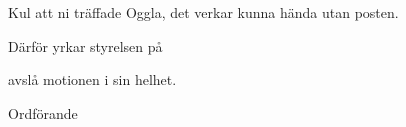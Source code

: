 \documentclass[../_main/handlingar.tex]{subfiles}
\begin{document}
\motionssvar

Kul att ni träffade Oggla, det verkar kunna hända utan posten.

Därför yrkar styrelsen på

\begin{attsatser}
    \att avslå motionen i sin helhet.
\end{attsatser}

\begin{signatures}{1}
    \ist
    \signature{\ordf}{Ordförande}
\end{signatures}
\end{document}
